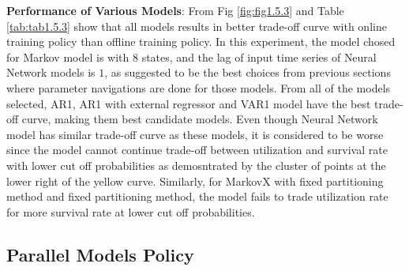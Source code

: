 \documentclass{article}
\begin{document}
\begin{flushleft}
\textbf{Performance of Various Models}: From Fig \ref{fig:fig1.5.3} and Table
\ref{tab:tab1.5.3} show that all models results in better trade-off curve with
online training policy than offline training policy. In this experiment, the
model chosed for Markov model is with $8$ states, and the lag of input time
series of Neural Network models is $1$, as suggested to be the best choices from
previous sections where parameter navigations are done for those models. From
all of the models selected, AR1, AR1 with external regressor and VAR1 model have
the best trade-off curve, making them best candidate models. Even though Neural
Network model has similar trade-off curve as these models, it is considered to
be worse since the model cannot continue trade-off between utilization and
survival rate with lower cut off probabilities as demosntrated by the cluster of
points at the lower right of the yellow curve. Similarly, for MarkovX with fixed
partitioning method and fixed partitioning method, the model fails to trade
utilization rate for more survival rate at lower cut off probabilities.
\end{flushleft}

\subsection{Parallel Models Policy}
\end{document}
